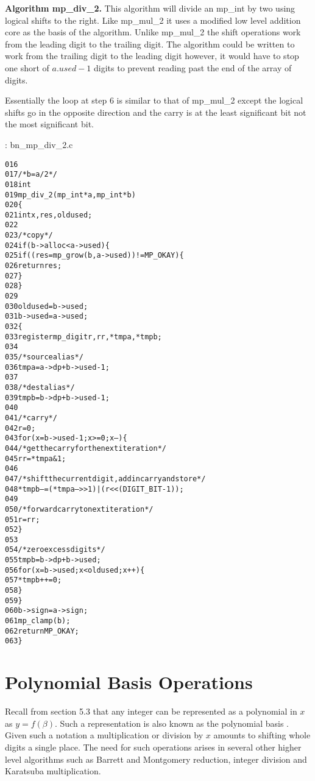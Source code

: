 \documentclass[b5paper]{book}
\begin{document}
\textbf{Algorithm mp\_div\_2.}
This algorithm will divide an mp\_int by two using logical shifts to the right.  Like mp\_mul\_2 it uses a modified low level addition
core as the basis of the algorithm.  Unlike mp\_mul\_2 the shift operations work from the leading digit to the trailing digit.  The algorithm
could be written to work from the trailing digit to the leading digit however, it would have to stop one short of $a.used - 1$ digits to prevent
reading past the end of the array of digits.

Essentially the loop at step 6 is similar to that of mp\_mul\_2 except the logical shifts go in the opposite direction and the carry is at the 
least significant bit not the most significant bit.  

\vspace{+3mm}\begin{small}
\hspace{-5.1mm}{\bf File}: bn\_mp\_div\_2.c
\vspace{-3mm}
\begin{alltt}
016   
017   /* b = a/2 */
018   int
019   mp_div_2 (mp_int * a, mp_int * b)
020   \{
021     int     x, res, oldused;
022   
023     /* copy */
024     if (b->alloc < a->used) \{
025       if ((res = mp_grow (b, a->used)) != MP_OKAY) \{
026         return res;
027       \}
028     \}
029   
030     oldused = b->used;
031     b->used = a->used;
032     \{
033       register mp_digit r, rr, *tmpa, *tmpb;
034   
035       /* source alias */
036       tmpa = a->dp + b->used - 1;
037   
038       /* dest alias */
039       tmpb = b->dp + b->used - 1;
040   
041       /* carry */
042       r = 0;
043       for (x = b->used - 1; x >= 0; x--) \{
044         /* get the carry for the next iteration */
045         rr = *tmpa & 1;
046   
047         /* shift the current digit, add in carry and store */
048         *tmpb-- = (*tmpa-- >> 1) | (r << (DIGIT_BIT - 1));
049   
050         /* forward carry to next iteration */
051         r = rr;
052       \}
053   
054       /* zero excess digits */
055       tmpb = b->dp + b->used;
056       for (x = b->used; x < oldused; x++) \{
057         *tmpb++ = 0;
058       \}
059     \}
060     b->sign = a->sign;
061     mp_clamp (b);
062     return MP_OKAY;
063   \}
\end{alltt}
\end{small}

\section{Polynomial Basis Operations}
Recall from section 5.3 that any integer can be represented as a polynomial in $x$ as $y = f(\beta)$.  Such a representation is also known as
the polynomial basis \cite[pp. 48]{ROSE}. Given such a notation a multiplication or division by $x$ amounts to shifting whole digits a single 
place.  The need for such operations arises in several other higher level algorithms such as Barrett and Montgomery reduction, integer
division and Karatsuba multiplication.  
\end{document}
